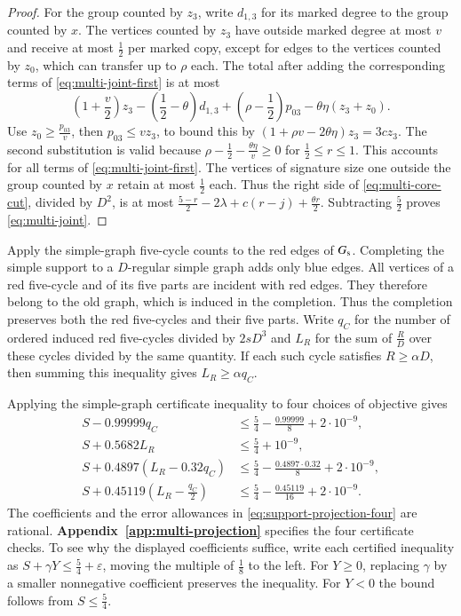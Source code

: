 \documentclass[preprint,11pt,numbers]{elsarticle-arxiv}
\numberwithin{equation}{section}
\theoremstyle{definition}
\begin{document}
\begin{proof}
For the group counted by $z_3$, write $d_{1,3}$ for its marked
degree to the group counted by $x$. The vertices counted by $z_3$
have outside marked degree at most $v$ and receive at most
$\frac{1}{2}$ per marked copy, except for edges to the vertices
counted by $z_0$, which can transfer up to $\rho$ each. The total
after adding the corresponding terms of \eqref{eq:multi-joint-first}
is at most
\[
 \left(1+\frac{v}{2}\right)z_3
 -\left(\frac{1}{2}-\theta\right)d_{1,3}
 +\left(\rho-\frac{1}{2}\right)p_{03}-\theta\eta(z_3+z_0).
\]
Use $z_0\ge\frac{p_{03}}{v}$, then $p_{03}\le v z_3$, to
bound this by $(1+\rho v-2\theta\eta)z_3=3c z_3$. The second
substitution is valid because
$\rho-\frac{1}{2}-\frac{\theta\eta}{v}\ge0$ for $\frac{1}{2}\le r\le1$.
This accounts for all terms of \eqref{eq:multi-joint-first}.
The vertices of signature size one outside the group counted by
$x$ retain at most $\frac{1}{2}$ each. Thus the right side of
\eqref{eq:multi-core-cut}, divided by $D^2$, is at most
$\frac{5-r}{2}-2\lambda+c(r-j)+\frac{\theta r}{2}$.
Subtracting $\frac{5}{2}$ proves \eqref{eq:multi-joint}.

\end{proof}

Apply the simple-graph five-cycle counts to the red edges of
$G_{\rm s}$. Completing the simple support to a $D$-regular simple
graph adds only blue edges. All vertices of a red five-cycle and of
its five parts are incident with red edges. They therefore belong
to the old graph, which is induced in the completion. Thus the
completion preserves both the red five-cycles and their five
parts. Write $q_C$ for the number of ordered induced red five-cycles
divided by $2sD^3$ and $L_R$ for the sum of $\frac RD$ over these
cycles divided by the same quantity. If each such cycle satisfies
$R\geq\alpha D$, then summing this inequality gives $L_R\geq\alpha q_C$.

Applying the simple-graph certificate inequality to four choices
of objective gives
\begin{equation}\label{eq:support-projection-four}
\begin{aligned}
 S-0.99999q_C
   &\le \frac{5}{4}-\frac{0.99999}{8}+2\cdot10^{-9},\\
 S+0.5682L_R
   &\le \frac{5}{4}+10^{-9},\\
 S+0.4897(L_R-0.32q_C)
   &\le \frac{5}{4}-\frac{0.4897\cdot0.32}{8}+2\cdot10^{-9},\\
 S+0.45119\left(L_R-\frac{q_C}{2}\right)
   &\le \frac{5}{4}-\frac{0.45119}{16}+2\cdot10^{-9}.
\end{aligned}
\end{equation}
The coefficients and the error allowances in
\eqref{eq:support-projection-four} are rational.
\textbf{Appendix~\ref{app:multi-projection}} specifies the
four certificate checks. To see why the displayed coefficients
suffice, write each certified inequality as $S+\gamma Y\leq
\frac54+\varepsilon$, moving the multiple of $\frac18$ to the left.
For $Y\geq0$, replacing $\gamma$ by a smaller nonnegative coefficient
preserves the inequality. For $Y<0$ the bound follows from
$S\leq\frac54$.
\end{document}
